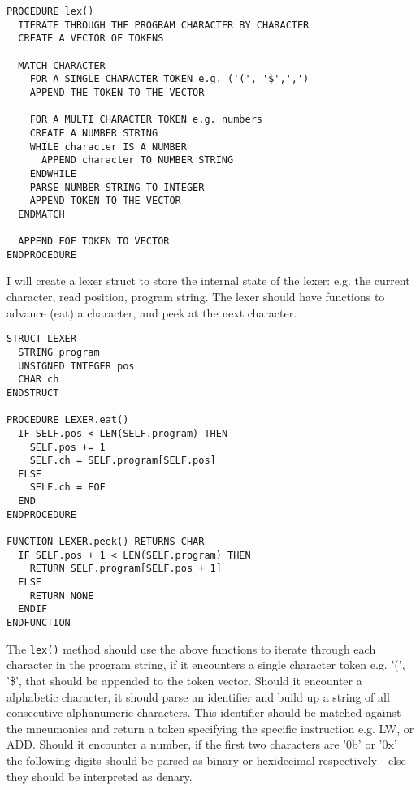 \begin{lstlisting}
PROCEDURE lex() 
  ITERATE THROUGH THE PROGRAM CHARACTER BY CHARACTER
  CREATE A VECTOR OF TOKENS
  
  MATCH CHARACTER 
    FOR A SINGLE CHARACTER TOKEN e.g. ('(', '$',',')
    APPEND THE TOKEN TO THE VECTOR

    FOR A MULTI CHARACTER TOKEN e.g. numbers
    CREATE A NUMBER STRING
    WHILE character IS A NUMBER 
      APPEND character TO NUMBER STRING 
    ENDWHILE 
    PARSE NUMBER STRING TO INTEGER 
    APPEND TOKEN TO THE VECTOR
  ENDMATCH

  APPEND EOF TOKEN TO VECTOR
ENDPROCEDURE
\end{lstlisting}

I will create a lexer struct to store the internal state of the lexer: e.g. the current character, read position, program string. The lexer should have functions to advance (eat) a character, and peek at the next character.

\begin{lstlisting}
STRUCT LEXER 
  STRING program
  UNSIGNED INTEGER pos 
  CHAR ch
ENDSTRUCT

PROCEDURE LEXER.eat() 
  IF SELF.pos < LEN(SELF.program) THEN 
    SELF.pos += 1 
    SELF.ch = SELF.program[SELF.pos]
  ELSE 
    SELF.ch = EOF 
  END
ENDPROCEDURE

FUNCTION LEXER.peek() RETURNS CHAR
  IF SELF.pos + 1 < LEN(SELF.program) THEN 
    RETURN SELF.program[SELF.pos + 1]
  ELSE 
    RETURN NONE
  ENDIF
ENDFUNCTION
\end{lstlisting}

The \texttt{lex()} method should use the above functions to iterate through each character in the program string, if it encounters a single character token e.g. '(', '\$', that should be appended to the token vector. Should it encounter a alphabetic character, it should parse an identifier and build up a string of all consecutive alphanumeric characters. This identifier should be matched against the mneumonics and return a token specifying the specific instruction e.g. LW, or ADD. Should it encounter a number, if the first two characters are '0b' or '0x' the following digits should be parsed as binary or hexidecimal respectively - else they should be interpreted as denary. 

